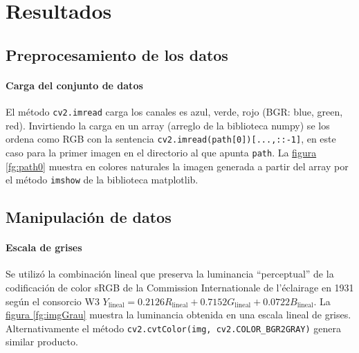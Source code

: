 \documentclass{article}
\begin{document}
\section{Resultados}

\subsection{Preprocesamiento de los datos}

\paragraph{Carga del conjunto de datos} 
El método \verb'cv2.imread' carga los canales es azul, verde, rojo (BGR: blue, green, red).
Invirtiendo la carga en un array (arreglo de la biblioteca numpy) se los ordena como RGB con la sentencia \verb'cv2.imread(path[0])[...,::-1]', en este caso para la primer imagen en el directorio al que apunta \verb'path'.
La \hyperref[fg:path0]{figura \ref*{fg:path0}} muestra en colores naturales la imagen generada a partir del array por el método \verb'imshow' de la biblioteca matplotlib.




\subsection{Manipulación de datos}

\paragraph{Escala de grises}
Se utilizó la combinación lineal que preserva la luminancia ``perceptual'' de la codificación de color sRGB de la Commission Internationale de l'éclairage en 1931 según el consorcio W3 \cite{noauthor_standard_1996} $
Y_\mathrm{lineal} = 0.2126 R_\mathrm{lineal} + 0.7152 G_\mathrm{lineal} + 0.0722 B_\mathrm{lineal} .
$
La \hyperref[fg:imgGrau]{figura \ref*{fg:imgGrau}} muestra la luminancia obtenida en una escala lineal de grises.
Alternativamente el método \verb'cv2.cvtColor(img, cv2.COLOR_BGR2GRAY)' genera similar producto.
\end{document}
